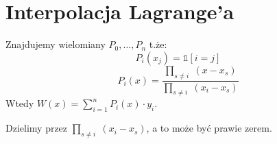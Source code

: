 \section{Interpolacja Lagrange’a}
Znajdujemy wielomiany \( P_0, \dots, P_n \) t.że: \\
\[
	P_i(x_j) = \mathbb{1}[i=j]
\]
\[
	P_i(x) = \frac{\prod_{s \neq i}\; (x - x_s)}{\prod_{s \neq i}\; (x_i - x_s)}
\]
Wtedy \( W(x) = \sum_{i=1}^{n} P_i(x) \cdot y_i \).

\begin{warning}
	Dzielimy przez \( \prod_{s \neq i}\; (x_i - x_s) \), a to może być prawie zerem.
\end{warning}
